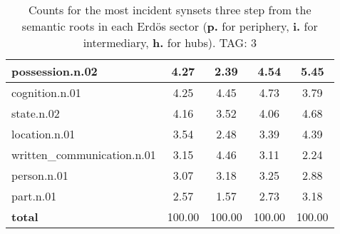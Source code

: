 \begin{table}[h!]
\begin{center}
\begin{tabular}{| l || c | c | c | c |}
possession.n.02 & 4.27  & 2.39  & 4.54  & 5.45 \\\hline
cognition.n.01 & 4.25  & 4.45  & 4.73  & 3.79 \\\hline
state.n.02 & 4.16  & 3.52  & 4.06  & 4.68 \\\hline
location.n.01 & 3.54  & 2.48  & 3.39  & 4.39 \\\hline
written\_communication.n.01 & 3.15  & 4.46  & 3.11  & 2.24 \\\hline
person.n.01 & 3.07  & 3.18  & 3.25  & 2.88 \\\hline
part.n.01 & 2.57  & 1.57  & 2.73  & 3.18 \\\hline\hline
{{\bf total}} & 100.00  & 100.00  & 100.00  & 100.00 \\\hline
\end{tabular}
\caption{Counts for the most incident synsets three step from the semantic roots in each Erd\"os sector ({\bf p.} for periphery, {\bf i.} for intermediary, {\bf h.} for hubs). TAG: 3}
\end{center}
\end{table}